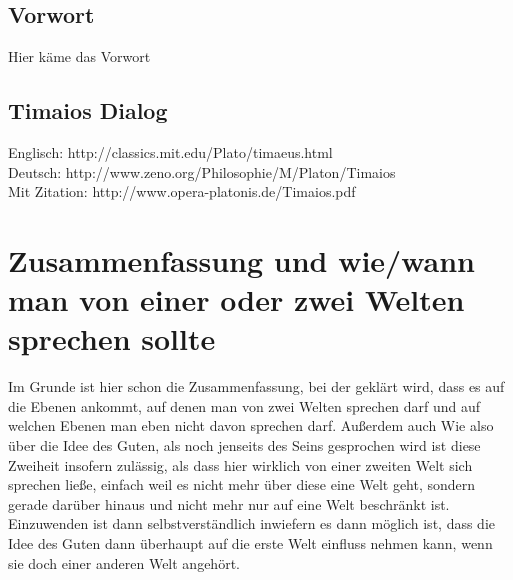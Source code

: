 \documentclass[12pt]{article}
\begin{document}

\newpage
{}
\subsection*{Vorwort}
Hier käme das Vorwort
\newpage
\tableofcontents
\newpage
\pagestyle{fancy}
\fancyhf{}
\fancyfoot[R]{\thepage}
\setcounter{page}{1}
\justifying
\subsection*{Timaios Dialog}
Englisch:   http://classics.mit.edu/Plato/timaeus.html\\
Deutsch:    http://www.zeno.org/Philosophie/M/Platon/Timaios\\
Mit Zitation: http://www.opera-platonis.de/Timaios.pdf


 




 



\section{Zusammenfassung und wie/wann man von einer oder zwei Welten sprechen sollte}
Im Grunde ist hier schon die Zusammenfassung, bei der geklärt wird, dass es auf die Ebenen ankommt, auf denen man von zwei Welten sprechen darf und auf welchen Ebenen man eben nicht davon sprechen darf. Außerdem auch 
Wie also über die Idee des Guten, als noch jenseits des Seins gesprochen wird ist diese Zweiheit insofern zulässig, als dass hier wirklich von einer zweiten Welt sich sprechen ließe, einfach weil es nicht mehr über diese eine Welt geht, sondern gerade darüber hinaus und nicht mehr nur auf eine Welt beschränkt ist. Einzuwenden ist dann selbstverständlich inwiefern es dann möglich ist, dass die Idee des Guten dann überhaupt auf die erste Welt einfluss nehmen kann, wenn sie doch einer anderen Welt angehört.  
\end{document}
